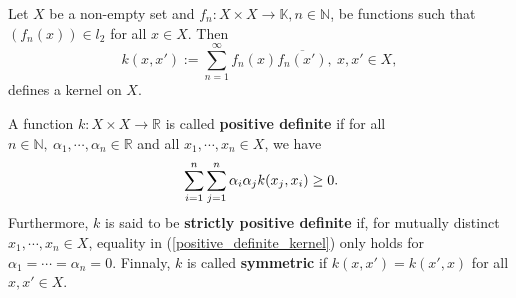 \begin{lemma}
Let $X$ be a non-empty set and $f_n:X\times X \rightarrow \mathbb{K}, n\in \mathbb{N}$, be functions such that $(f_n(x))\in l_2$ for all $x\in X$. Then 
\begin{equation}
k(x,x'):= \sum_{n=1}^{\infty} f_n(x) \overline{f_n(x')},~x,x'\in X,
\end{equation}
defines a kernel on $X$.
\end{lemma}

\begin{definition}
A function $k:X\times X \rightarrow \mathbb{R}$ is called \textbf{positive definite} if for all $n\in \mathbb{N}, ~\alpha_1,\cdots,\alpha_n\in \mathbb{R}$ and all $x_1,\cdots,x_n \in X$, we have
\begin{equation}{\label{positive_definite_kernel}}
\displaystyle\sum_{i=1}^n\sum_{j=1}^n\alpha_i \alpha_j k(x_j,x_i)\geq 0.
\end{equation}
Furthermore, $k$ is said to be \textbf{strictly positive definite} if, for mutually distinct $x_1,\cdots,x_n \in X$, equality in (\ref{positive_definite_kernel}) only holds for $\alpha_1=\cdots=\alpha_n=0$. Finnaly, $k$ is called \textbf{symmetric} if $k(x,x')=k(x',x)$ for all $x,x' \in X$.
\end{definition}

